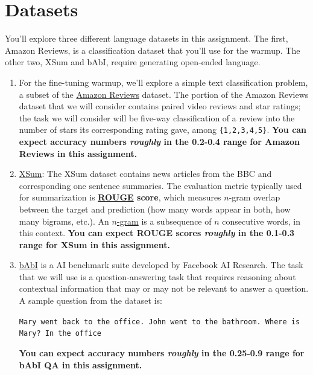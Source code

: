 \documentclass[12pt]{article}
\begin{document}
\section*{Datasets}

You'll explore three different language datasets in this assignment. The first, Amazon Reviews, is a classification dataset that you'll use for the warmup. The other two, XSum and bAbI, require generating open-ended language.

\begin{enumerate}
    \item For the fine-tuning warmup, we'll explore a simple text classification problem, a subset of the \href{https://huggingface.co/datasets/amazon\_us\_reviews}{Amazon Reviews} dataset. The portion of the Amazon Reviews dataset that we will consider contains paired video reviews and star ratings; the task we will consider will be five-way classification of a review into the number of stars its corresponding rating gave, among \texttt{\{1,2,3,4,5\}}. \textbf{You can expect accuracy numbers \textit{roughly} in the 0.2-0.4 range for Amazon Reviews in this assignment.}
    \item \href{https://huggingface.co/datasets/xsum}{XSum}: The XSum dataset contains news articles from the BBC and corresponding one sentence summaries. The evaluation metric typically used for summarization is \textbf{\href{https://en.wikipedia.org/wiki/ROUGE_(metric)}{ROUGE} score}, which measures $n$-gram overlap between the target and prediction (how many words appear in both, how many bigrams, etc.). An \href{https://en.wikipedia.org/wiki/N-gram#Examples}{$n$-gram} is a subsequence of $n$ consecutive words, in this context.  \textbf{You can expect ROUGE scores \textit{roughly} in the 0.1-0.3 range for XSum in this assignment.}
    \item \href{https://research.facebook.com/downloads/babi/}{bAbI} is a AI benchmark suite developed by Facebook AI Research. The task that we will use is a question-answering task that requires reasoning about contextual information that may or may not be relevant to answer a question. A sample question from the dataset is:
    
    \texttt{Mary went back to the office. John went to the bathroom. Where is Mary? In the office}
    
    \textbf{You can expect accuracy numbers \textit{roughly} in the 0.25-0.9 range for bAbI QA in this assignment.}
\end{enumerate}
\end{document}
